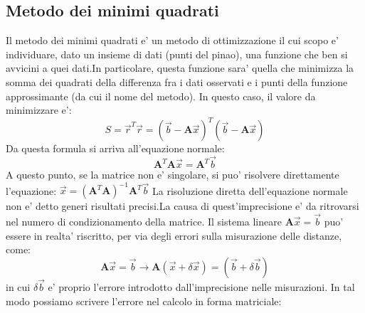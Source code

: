 \subsection{Metodo dei minimi quadrati}
Il metodo dei minimi quadrati e' un metodo di ottimizzazione il cui scopo e' individuare, dato un insieme di dati (punti del pinao), una funzione che ben si avvicini a quei dati.\newline In particolare, questa funzione sara' quella che minimizza la somma dei quadrati della differenza fra i dati osservati e i punti della funzione approssimante (da cui il nome del metodo).\newline
In questo caso, il valore da minimizzare e': \newline
\begin{equation}
S = \overrightarrow{r}^T\overrightarrow{r} = (\overrightarrow{b}-\textbf{A}\overrightarrow{x})^T(\overrightarrow{b}-\textbf{A}\overrightarrow{x})
\end{equation}
\newline
Da questa formula si arriva all'equazione normale:\newline
\begin{equation}
\textbf{A}^T\textbf{A}\overrightarrow{x} = \textbf{A}^T\overrightarrow{b}
\end{equation}
\newline
A questo punto, se la matrice non e' singolare, si puo' risolvere direttamente l'equazione:\newline
$\overrightarrow{x} = (\textbf{A}^T\textbf{A})^{-1}\textbf{A}^T\overrightarrow{b}$
La risoluzione diretta dell'equazione normale non e' detto generi risultati precisi.\newline La causa di quest'imprecisione e' da ritrovarsi nel numero di condizionamento della matrice.\newline
Il sistema lineare $\textbf{A}\overrightarrow{x} = \overrightarrow{b}$ puo' essere in realta' riscritto, per via degli errori sulla misurazione delle distanze, come: \newline
\begin{equation}
\textbf{A}\overrightarrow{x} = \overrightarrow{b} \rightarrow \textbf{A}(\overrightarrow{x}+\delta\overrightarrow{x}) = (\overrightarrow{b}+\delta\overrightarrow{b})
\end{equation}
\newline
in cui $\delta\overrightarrow{b}$ e' proprio l'errore introdotto dall'imprecisione nelle misurazioni.
In tal modo possiamo scrivere l'errore nel calcolo in forma matriciale:\newline
